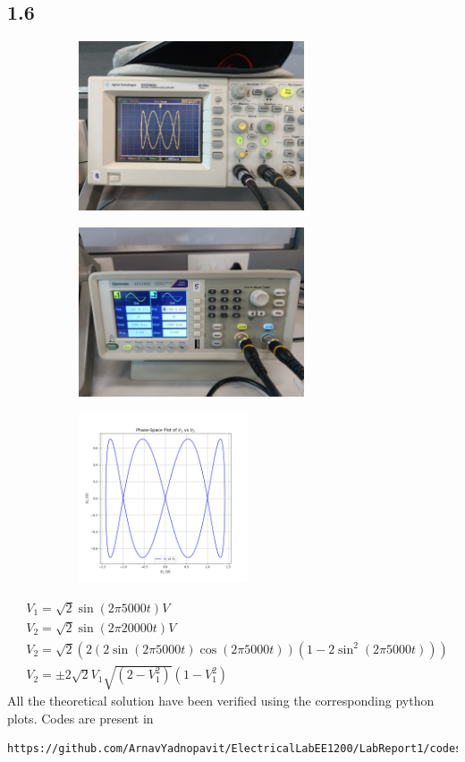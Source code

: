 \documentclass[a4paper,12pt]{article}
\begin{document}
\subsection*{1.6}
\begin{figure}[H]
    \centering
    \begin{subfigure}{0.5\textwidth}
        \centering
        \includegraphics[height=5cm]{figs/6/plot.jpeg}
    \end{subfigure}%
    \begin{subfigure}{0.5\textwidth}
        \centering
        \includegraphics[height=5cm]{figs/6/para.jpeg}
    \end{subfigure}
    \begin{subfigure}{0.5\textwidth}
        \centering
        \includegraphics[height=5cm]{figs/6/pyplot.png}
    \end{subfigure}%
\end{figure}
\begin{align}
    &V_1=\sqrt{2}\sin(2\pi 5000t) V\\
    &V_2=\sqrt{2}\sin(2\pi 20000t) V\\
    &V_2=\sqrt{2}(2(2\sin(2\pi 5000t)\cos(2\pi 5000t))(1-2\sin^2(2\pi 5000t)))\\
    &V_2=\pm2\sqrt{2}V_1\sqrt{(2-V_1^2)}(1-V_1^2)
\end{align}
All the theoretical solution have been verified using the corresponding python plots. Codes are present in
\begin{lstlisting}
https://github.com/ArnavYadnopavit/ElectricalLabEE1200/LabReport1/codes
\end{lstlisting}
\end{document}
